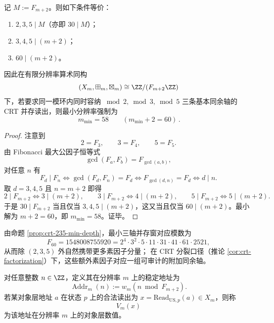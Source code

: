 \begin{proposition}[2/3/5 三轴并存的最小模深度]\label{prop:crt-235-min-depth}
记 \(M:=F_{m+2}\)。则如下条件等价：
\begin{enumerate}
  \item \(2,3,5\mid M\)（亦即 \(30\mid M\)）；
  \item \(3,4,5\mid (m+2)\)；
  \item \(60\mid (m+2)\)。
\end{enumerate}
因此在有限分辨率算术同构
\[
(X_m,\boxplus_m,\boxtimes_m)\cong \ZZ/(F_{m+2}\ZZ)
\]
下，若要求同一模环内同时容纳 \(\bmod 2,\bmod 3,\bmod 5\) 三条基本同余轴的 CRT 并存读出，则最小分辨率强制为
\[
\boxed{\,m_{\min}=58\qquad(m_{\min}+2=60)\, }.
\]
\end{proposition}
\begin{proof}
注意到
\[
2=F_3,\qquad 3=F_4,\qquad 5=F_5.
\]
由 Fibonacci 最大公因子恒等式
\[
\gcd(F_a,F_b)=F_{\gcd(a,b)},
\]
对任意 \(n\) 有
\[
F_d\mid F_n
\Longleftrightarrow
\gcd(F_d,F_n)=F_d
\Longleftrightarrow
F_{\gcd(d,n)}=F_d
\Longleftrightarrow
d\mid n.
\]
取 \(d=3,4,5\) 且 \(n=m+2\) 即得
\[
2\mid F_{m+2}\Longleftrightarrow 3\mid(m+2),\qquad
3\mid F_{m+2}\Longleftrightarrow 4\mid(m+2),\qquad
5\mid F_{m+2}\Longleftrightarrow 5\mid(m+2).
\]
于是 \(30\mid F_{m+2}\) 当且仅当 \(3,4,5\mid(m+2)\)，这又当且仅当 \(60\mid(m+2)\)。最小解为 \(m+2=60\)，即 \(m_{\min}=58\)。证毕。
\end{proof}

\begin{remark}[\texorpdfstring{$m=58$}{m=58} 的三轴 CRT 模数与素因子丰富性]\label{rem:crt-235-m58-factorization}
由命题 \ref{prop:crt-235-min-depth}，最小三轴并存窗对应模数为
\[
F_{60}=1548008755920
=2^4\cdot 3^2\cdot 5\cdot 11\cdot 31\cdot 41\cdot 61\cdot 2521,
\]
从而除 \((2,3,5)\) 外自然携带更多素因子分量；
在 CRT 分裂口径（推论 \ref{cor:crt-factorization}）下，这些额外素因子对应一组可审计的附加同余轴。
\end{remark}

\begin{definition}[稳定地址的数值化]
对任意整数 \(n\in \ZZ\)，定义其在分辨率 \(m\) 上的稳定地址为
\[
\operatorname{Addr}_m(n):=w_m(n\bmod F_{m+2}).
\]
若某对象层地址 \(a\) 在状态 \(p\) 上的合法读出为 \(x=\mathrm{Read}_{\mathrm{US},p}(a)\in X_m\)，则称
\[
V_m(x)
\]
为该地址在分辨率 \(m\) 上的对象层数值。
\end{definition}

